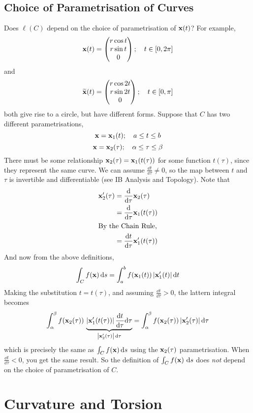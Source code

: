 \documentclass{article}
\begin{document}
\subsection{Choice of Parametrisation of Curves}
Does $\ell(C)$ depend on the choice of parametrisation of $\vb x(t)$? For example,
\[ \vb x(t) = \begin{pmatrix}
		r\cos t \\ r \sin t \\ 0
	\end{pmatrix};\quad t \in [0, 2\pi] \]
and
\[ \widetilde{\vb x}(t) = \begin{pmatrix}
		r\cos 2t \\ r \sin 2t \\ 0
	\end{pmatrix};\quad t \in [0, \pi] \]
both give rise to a circle, but have different forms. Suppose that $C$ has two different parametrisations,
\[ \vb x = \vb x_1(t);\quad a \leq t \leq b \]
\[ \vb x = \vb x_2(\tau);\quad \alpha \leq \tau \leq \beta \]
There must be some relationship $\vb x_2(\tau) = \vb x_1(t(\tau))$ for some function $t(\tau)$, since they represent the same curve. We can assume $\frac{\dd{t}}{\dd \tau} \neq 0$, so the map between $t$ and $\tau$ is invertible and differentiable (see IB Analysis and Topology). Note that
\begin{align*}
	\vb x_2'(\tau) & = \frac{\dd}{\dd \tau}\vb x_2(\tau)        \\
	               & = \frac{\dd}{\dd \tau}\vb x_1(t(\tau))     \\
	\intertext{By the Chain Rule,}
	               & = \frac{\dd{t}}{\dd \tau}\vb x_1'(t(\tau))
\end{align*}
And now from the above definitions,
\[ \int_C f(\vb x) \dd{s} = \int_a^b f(\vb x_1(t)) \, \abs{\vb x_1'(t)} \dd{t} \]
Making the substitution $t = t(\tau)$, and assuming $\frac{\dd{t}}{\dd \tau} > 0$, the lattern integral becomes
\[ \int_\alpha^\beta f(\vb x_2(\tau)) \, \underbrace{\abs{\vb x_1'(t(\tau))} \,\frac{\dd{t}}{\dd \tau}\dd \tau}_{\abs{\vb x_2'(\tau)}\,\dd \tau} = \int_\alpha^\beta f(\vb x_2(\tau)) \, \abs{\vb x_2'(\tau)} \,\dd \tau \]
which is precisely the same as $\int_C f(\vb x) \dd{s}$ using the $\vb x_2(\tau)$ parametrisation. When $\frac{\dd{t}}{\dd \tau} < 0$, you get the same result. So the definition of $\int_C f(\vb x) \, \dd{s}$ does \textit{not} depend on the choice of parametrisation of $C$.

\section{Curvature and Torsion}
\end{document}
